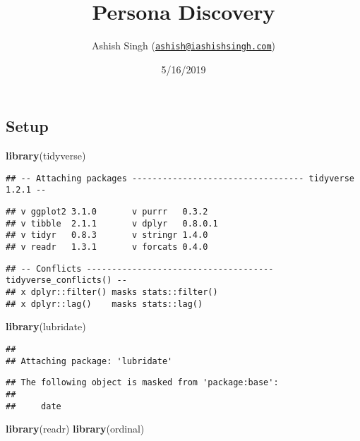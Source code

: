 \documentclass[]{article}
\title{Persona Discovery}
\author{Ashish Singh
(\href{mailto:ashish@iashishsingh.com}{\nolinkurl{ashish@iashishsingh.com}})}
\date{5/16/2019}
\newenvironment{Shaded}{\begin{snugshade}}{\end{snugshade}}
\newcommand{\KeywordTok}[1]{\textcolor[rgb]{0.13,0.29,0.53}{\textbf{{#1}}}}
\newcommand{\NormalTok}[1]{{#1}}
\begin{document}
\maketitle

\subsection{Setup}\label{setup}

\begin{Shaded}
\begin{Highlighting}[]
\KeywordTok{library}\NormalTok{(tidyverse)}
\end{Highlighting}
\end{Shaded}

\begin{verbatim}
## -- Attaching packages ---------------------------------- tidyverse 1.2.1 --
\end{verbatim}

\begin{verbatim}
## v ggplot2 3.1.0       v purrr   0.3.2  
## v tibble  2.1.1       v dplyr   0.8.0.1
## v tidyr   0.8.3       v stringr 1.4.0  
## v readr   1.3.1       v forcats 0.4.0
\end{verbatim}

\begin{verbatim}
## -- Conflicts ------------------------------------- tidyverse_conflicts() --
## x dplyr::filter() masks stats::filter()
## x dplyr::lag()    masks stats::lag()
\end{verbatim}

\begin{Shaded}
\begin{Highlighting}[]
\KeywordTok{library}\NormalTok{(lubridate)}
\end{Highlighting}
\end{Shaded}

\begin{verbatim}
## 
## Attaching package: 'lubridate'
\end{verbatim}

\begin{verbatim}
## The following object is masked from 'package:base':
## 
##     date
\end{verbatim}

\begin{Shaded}
\begin{Highlighting}[]
\KeywordTok{library}\NormalTok{(readr)}
\KeywordTok{library}\NormalTok{(ordinal)}
\end{Highlighting}
\end{Shaded}
\end{document}
